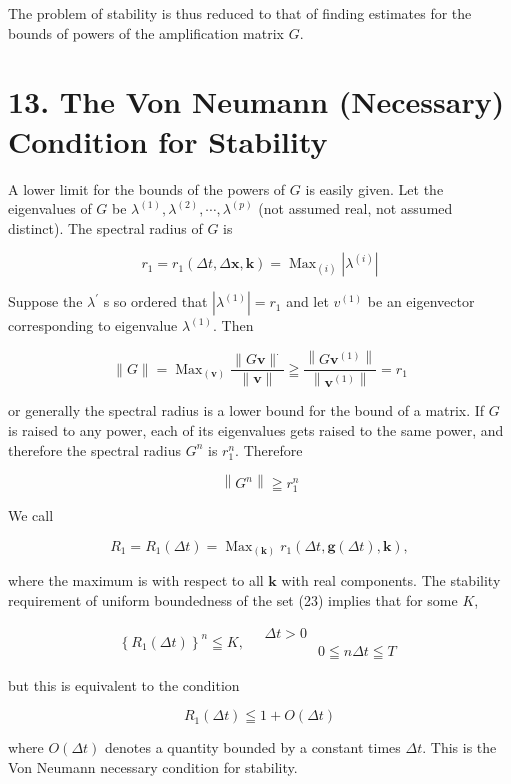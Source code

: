 \documentclass[10pt]{article}
\begin{document}
The problem of stability is thus reduced to that of finding estimates for the bounds of powers of the amplification matrix \(G\).

\section*{13. The Von Neumann (Necessary) Condition for Stability}
A lower limit for the bounds of the powers of \(G\) is easily given. Let the eigenvalues of \(G\) be \(\lambda^{(1)}, \lambda^{(2)}, \cdots, \lambda^{(p)}\) (not assumed real, not assumed distinct). The spectral radius of \(G\) is

\[
r_{1}=r_{1}(\Delta t, \Delta \mathbf{x}, \mathbf{k})=\operatorname{Max}_{(i)}\left|\lambda^{(i)}\right|
\]

Suppose the \(\lambda^{\prime}\) s so ordered that \(\left|\lambda^{(1)}\right|=r_{1}\) and let \(v^{(1)}\) be an eigenvector corresponding to eigenvalue \(\lambda^{(1)}\). Then

\[
\|G\|=\operatorname{Max}_{(\mathbf{v})} \frac{\|G \mathbf{v}\|^{\cdot}}{\|\mathbf{v}\|} \geqq \frac{\left\|G \mathbf{v}^{(1)}\right\|}{\left\|\mathbf{v}^{(1)}\right\|}=r_{1}
\]

or generally the spectral radius is a lower bound for the bound of a matrix. If \(G\) is raised to any power, each of its eigenvalues gets raised to the same power, and therefore the spectral radius \(G^{n}\) is \(r_{1}^{n}\). Therefore

\[
\left\|G^{n}\right\| \geqq r_{1}^{n}
\]

We call

\[
R_{1}=R_{1}(\Delta t)=\operatorname{Max}_{(\mathbf{k})} r_{1}(\Delta t, \mathbf{g}(\Delta t), \mathbf{k}),
\]

where the maximum is with respect to all \(\mathbf{k}\) with real components. The stability requirement of uniform boundedness of the set (23) implies that for some \(K\),

\[
\left\{R_{1}(\Delta t)\right\}^{n} \leqq K, \quad \begin{array}{ll}
\Delta t>0 \\
& 0 \leqq n \Delta t \leqq T
\end{array}
\]

but this is equivalent to the condition

\[
R_{1}(\Delta t) \leqq 1+O(\Delta t)
\]

where \(O(\Delta t)\) denotes a quantity bounded by a constant times \(\Delta t\). This is the Von Neumann necessary condition for stability.
\end{document}
